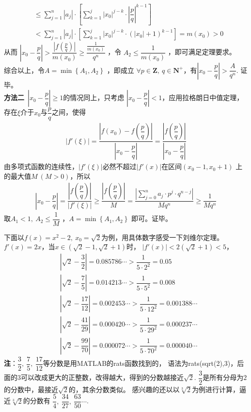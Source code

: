 \begin{itemize}[leftmargin=\inteval{\myitemleftmargin}pt,itemsep=
   \inteval{\myitemitempsep}pt,topsep=\inteval{\myitemtopsep}pt]
\begin{align*}
    &\leq \sum_{j=1}^{n}\left|a_{j}\right|\cdot \left[\sum_{k=1}^{j}|x_0|^{j-k}\cdot \left|\dfrac{p}{q}\right|^{k-1}\right]\\ &<\sum_{j=1}^{n}\left|a_{j}\right|\cdot \left[\sum_{k=1}^{j}|x_0|^{j-k}\cdot (|x_0|+1)^{k-1}\right]=m(x_0)>0
\end{align*}
从而 $ \left|x_0-\dfrac{p}{q}\right|>\dfrac{\left|f\left(\frac{p}{q}\right)\right|}{m(x_0)}\geq \dfrac{\frac{1}{m(x_0)}}{q^{n}} $ ，令 $ A_{2}\leq \dfrac{1}{m(x_0)} $ ，即可满足定理要求。\\
综合以上，令$ A=\min\left\{A_{1},A_{2}\right\} $ ，即成立 $ \forall p\in\textbf{Z},\ q\in\textbf{N}^{+} $，有$ \left|x_0-\dfrac{p}{q}\right|>\dfrac{A}{q^{n}} $. 证毕。\\
\textbf{方法二}\ $ \left|x_0-\dfrac{p}{q}\right|\geq 1 $的情况同上，只考虑
$ \left|x_0-\dfrac{p}{q}\right|<1 $，应用拉格朗日中值定理，
存在$ \xi $介于$ x_0 $与$ \dfrac{p}{q} $之间，使得
\begin{gather*}
    |f'(\xi)|=\dfrac{\left|f(x_0)-f\left(\dfrac{p}{q}\right)
        \right|}{\left|x_0 -\dfrac{p}{q}\right|}=
    \dfrac{\left|f\left(\dfrac{p}{q}\right)
        \right|}{\left|x_0-\dfrac{p}{q}\right|}
\end{gather*}
由多项式函数的连续性，$ |f'(\xi)| $必然不超过$ |f'(x)| $在区间$ (x_0-1,x_0+1) $
上的最大值$ M\ (M>0) $，所以
\begin{gather*}
    \left|x_0-\dfrac{p}{q}\right|=
    \dfrac{\left|f\left(\dfrac{p}{q}\right)\right|}{\left|f'(\xi)\right|}\geq 
    \dfrac{\left|f\left(\dfrac{p}{q}\right)\right|}{M}=
    \dfrac{\left|\sum\limits_{j=0}^{n}a_{j}\cdot p^{j}\cdot q^{n-j}\right|}{Mq^{n}}\geq \dfrac{1}{Mq^{n}}
\end{gather*}
取$ A_1<1,\ A_2\leq \dfrac{1}{M} $ ，$ A=\min\left\{A_{1},A_{2}\right\} $ 即可。证毕。

下面以$ f(x)=x^2-2,\ x_0=\sqrt{2} $为例，用具体数字感受一下刘维尔定理。
$ f'(x)=2x $，当$ x\in(\sqrt{2}-1,\sqrt{2}+1) $时，
$ |f'(x)|<2(\sqrt{2}+1)<5 $，
\begin{align*}
    & \left|\sqrt{2} -\dfrac{3}{2}\right|=0.085786\cdots >\dfrac{1}{5\cdot 2^2}=0.05  \\
    & \left|\sqrt{2} -\dfrac{7}{5}\right|=0.014213\cdots >\dfrac{1}{5\cdot 5^2}=0.008  \\
    & \left|\sqrt{2} -\dfrac{17}{12}\right|=0.002453\cdots >\dfrac{1}{5\cdot 12^2}=0.001388\cdots  \\
    & \left|\sqrt{2} -\dfrac{41}{29}\right|=0.000420\cdots >\dfrac{1}{5\cdot 29^2}=0.000237\cdots  \\
    & \left|\sqrt{2} -\dfrac{99}{70}\right|=0.000072\cdots >\dfrac{1}{5\cdot 70^2}=0.000040\cdots 
\end{align*}
\textbf{注}：$ \dfrac{3}{2},\ \dfrac{7}{5},\ \dfrac{17}{12} $等分数是用MATLAB的rats函数找到的，
语法为rats(sqrt(2),3)，后面的3可以改成更大的正整数，改得越大，得到的分数越接近$ \sqrt{2} $.
$ \dfrac{3}{2} $是所有分母为$ 2 $的分数中，最接近$ \sqrt{2} $的，其余分数类似。
感兴趣的还以以$ \sqrt[3]{2} $为例进行计算，逼近$ \sqrt[3]{2} $的分数有
$ \dfrac{5}{4},\ \dfrac{34}{27},\ \dfrac{63}{50}\cdots $. 


\end{itemize}
